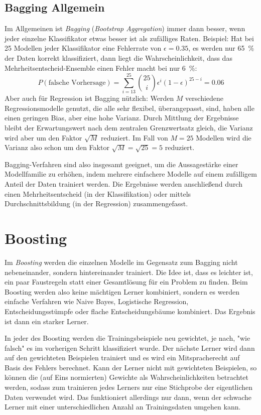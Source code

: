 		\subsection{Bagging Allgemein}
			Im Allgemeinen ist \emph{Bagging} (\emph{Bootstrap Aggregation}) immer dann besser, wenn jeder einzelne Klassifikator etwas besser ist als zufälliges Raten. Beispiel: Hat bei \num{25} Modellen jeder Klassifikator eine Fehlerrate von \(\epsilon = 0.35\), \dh es werden nur \SI{65}{\percent} der Daten korrekt klassifiziert, dann liegt die Wahrscheinlichkeit, dass das Mehrheitsentscheid-Ensemble einen Fehler macht bei nur \SI{6}{\percent}:
			\begin{equation}
				P(\text{falsche Vorhersage}) = \sum_{i = 13}^{25} { 25 \choose i } \epsilon^i (1 - \epsilon)^{25 - i} = 0.06
			\end{equation}
			Aber auch für Regression ist Bagging nützlich: Werden \(M\) verschiedene Regressionsmodelle genutzt, die alle sehr flexibel, \dh überangepasst, sind, haben alle einen geringen Bias, aber eine hohe Varianz. Durch Mittlung der Ergebnisse bleibt der Erwartungswert nach dem zentralen Grenzwertsatz gleich, die Varianz wird aber um den Faktor \(\sqrt{M}\) reduziert. Im Fall von \(M = 25\) Modellen wird die Varianz also schon um den Faktor \(\sqrt{M} = \sqrt{25} = 5\) reduziert.

			Bagging-Verfahren sind also insgesamt geeignet, um die Aussagestärke einer Modellfamilie zu erhöhen, indem mehrere einfachere Modelle auf einem zufälligem Anteil der Daten trainiert werden. Die Ergebnisse werden anschließend durch einen Mehrheitsentscheid (in der Klassifikation) oder mittels Durchschnittsbildung (in der Regression) zusammengefasst.

	\section{Boosting}
		Im \emph{Boosting} werden die einzelnen Modelle im Gegensatz zum Bagging nicht nebeneinander, sondern hintereinander trainiert. Die Idee ist, dass es leichter ist, ein paar Faustregeln statt einer Gesamtlösung für ein Problem zu finden. Beim Boosting werden also keine mächtigen Lerner kombiniert, sondern es werden einfache Verfahren wie Naive Bayes, Logistische Regression, Entscheidungsstümpfe oder flache Entscheidungsbäume kombiniert. Das Ergebnis ist dann ein starker Lerner.

		In jeder des Boosting werden die Trainingsbeispiele neu gewichtet, je nach, "wie falsch" es im vorherigen Schritt klassifiziert wurde. Der nächste Lerner wird dann auf den gewichteten Beispielen trainiert und es wird ein Mitspracherecht auf Basis des Fehlers berechnet. Kann der Lerner nicht mit gewichteten Beispielen, so können die (auf Eins normierten) Gewichte als Wahrscheinlichkeiten betrachtet werden, sodass zum trainieren jedes Lerners nur eine Stichprobe der eigentlichen Daten verwendet wird. Das funktioniert allerdings nur dann, wenn der schwache Lerner mit einer unterschiedlichen Anzahl an Trainingsdaten umgehen kann.

